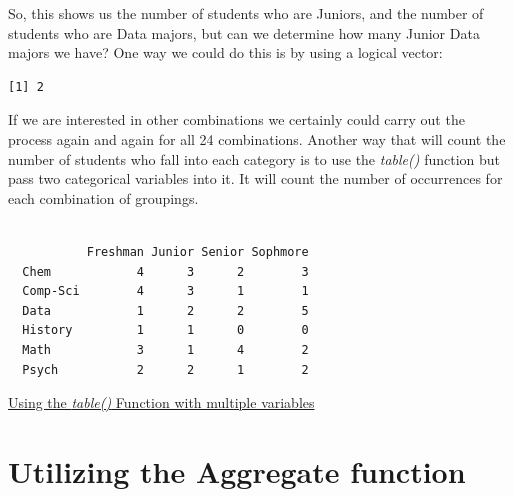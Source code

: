 \documentclass[
  letterpaper,
  DIV=11,
  numbers=noendperiod]{scrreprt}
\newenvironment{Shaded}{\begin{snugshade}}{\end{snugshade}}
\newcommand{\FunctionTok}[1]{\textcolor[rgb]{0.28,0.35,0.67}{#1}}
\newcommand{\NormalTok}[1]{\textcolor[rgb]{0.00,0.23,0.31}{#1}}
\newcommand{\SpecialCharTok}[1]{\textcolor[rgb]{0.37,0.37,0.37}{#1}}
\newcommand{\StringTok}[1]{\textcolor[rgb]{0.13,0.47,0.30}{#1}}
\begin{document}
So, this shows us the number of students who are Juniors, and the number
of students who are Data majors, but can we determine how many Junior
Data majors we have? One way we could do this is by using a logical
vector:

\begin{Shaded}
\end{Shaded}

\begin{verbatim}
[1] 2
\end{verbatim}

If we are interested in other combinations we certainly could carry out
the process again and again for all 24 combinations. Another way that
will count the number of students who fall into each category is to use
the \emph{table()} function but pass two categorical variables into it.
It will count the number of occurrences for each combination of
groupings.

\begin{Shaded}
\end{Shaded}

\begin{verbatim}
          
           Freshman Junior Senior Sophmore
  Chem            4      3      2        3
  Comp-Sci        4      3      1        1
  Data            1      2      2        5
  History         1      1      0        0
  Math            3      1      4        2
  Psych           2      2      1        2
\end{verbatim}

\begin{watch}{}{}
    \href{https://youtu.be/Oq4GZnTAHNk}{Using the \textit{table()} Function with multiple variables}
\end{watch}

\section{Utilizing the Aggregate
function}\label{utilizing-the-aggregate-function}
\end{document}
